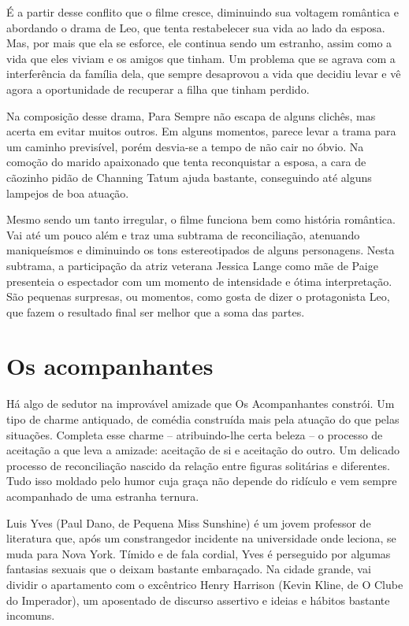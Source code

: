 \documentclass[a4paper,11pt,openright,openbib]{article}
\begin{document}
É a partir desse conflito que o filme cresce, diminuindo sua voltagem romântica e abordando o drama de Leo, que tenta restabelecer sua vida ao lado da esposa. Mas, por mais que ela se esforce, ele continua sendo um estranho, assim como a vida que eles viviam e os amigos que tinham. Um problema que se agrava com a interferência da família dela, que sempre desaprovou a vida que decidiu levar e vê agora a oportunidade de recuperar a filha que tinham perdido.

Na composição desse drama, Para Sempre não escapa de alguns clichês, mas acerta em evitar muitos outros. Em alguns momentos, parece levar a trama para um caminho previsível, porém desvia-se a tempo de não cair no óbvio. Na comoção do marido apaixonado que tenta reconquistar a esposa, a cara de cãozinho pidão de Channing Tatum ajuda bastante, conseguindo até alguns lampejos de boa atuação.

Mesmo sendo um tanto irregular, o filme funciona bem como história romântica. Vai até um pouco além e traz uma subtrama de reconciliação, atenuando maniqueísmos e diminuindo os tons estereotipados de alguns personagens. Nesta subtrama, a participação da atriz veterana Jessica Lange como mãe de Paige presenteia o espectador com um momento de intensidade e ótima interpretação. São pequenas surpresas, ou momentos, como gosta de dizer o protagonista Leo, que fazem o resultado final ser melhor que a soma das partes.

\section{Os acompanhantes}
Há algo de sedutor na improvável amizade que Os Acompanhantes constrói. Um tipo de charme antiquado, de comédia construída mais pela atuação do que pelas situações. Completa esse charme – atribuindo-lhe certa beleza – o processo de aceitação a que leva a amizade: aceitação de si e aceitação do outro. Um delicado processo de reconciliação nascido da relação entre figuras solitárias e diferentes. Tudo isso moldado pelo humor cuja graça não depende do ridículo e vem sempre acompanhado de uma estranha ternura.

Luis Yves (Paul Dano, de Pequena Miss Sunshine) é um jovem professor de literatura que, após um constrangedor incidente na universidade onde leciona, se muda para Nova York. Tímido e de fala cordial, Yves é perseguido por algumas fantasias sexuais que o deixam bastante embaraçado. Na cidade grande, vai dividir o apartamento com o excêntrico Henry Harrison (Kevin Kline, de O Clube do Imperador), um aposentado de discurso assertivo e ideias e hábitos bastante incomuns.
\end{document}
